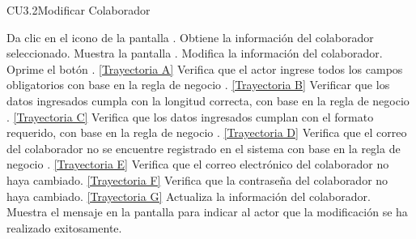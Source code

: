 \begin{UseCase}{CU3.2}{Modificar Colaborador}
	\end{UseCase}
	\begin{UCtrayectoria}
		\UCpaso[\UCactor] Da clic en el icono \editar de la pantalla .
		\UCpaso[\UCsist] Obtiene la información del colaborador seleccionado.
		\UCpaso[\UCsist] Muestra la pantalla .
		\UCpaso[\UCactor] Modifica la información del colaborador. \label{CU3.2-P5}
		\UCpaso[\UCactor] Oprime el botón . \hyperlink{CU3-2:TAA}{[Trayectoria A]}
		\UCpaso[\UCsist] Verifica que el actor ingrese todos los campos obligatorios con base en la regla de negocio . \hyperlink{CU3-2:TAB}{[Trayectoria B]}
		\UCpaso[\UCsist] Verificar que los datos ingresados cumpla con la longitud correcta, con base en la regla de negocio . \hyperlink{CU3-2:TAC}{[Trayectoria C]} 
		\UCpaso[\UCsist] Verifica que los datos ingresados cumplan con el formato requerido, con base en la regla de negocio . \hyperlink{CU3-2:TAD}{[Trayectoria D]} 
		\UCpaso[\UCsist] Verifica que el correo del colaborador no se encuentre registrado en el sistema con base en la regla de negocio . \hyperlink{CU3-2:TAE}{[Trayectoria E]}
		\UCpaso[\UCsist] Verifica que el correo electrónico del colaborador no haya cambiado. \hyperlink{CU3-2:TAF}{[Trayectoria F]}
		\UCpaso[\UCsist] Verifica que la contraseña del colaborador no haya cambiado. \hyperlink{CU3-2:TAG}{[Trayectoria G]}
		\UCpaso[\UCsist] Actualiza la información del colaborador.\label{CU3.2-P10}
		\UCpaso[\UCsist] Muestra el mensaje  en la pantalla  para indicar al actor que la modificación se ha realizado exitosamente. 
	\end{UCtrayectoria}		
